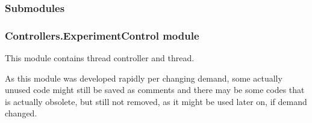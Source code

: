 \documentclass[letterpaper,10pt,english]{sphinxmanual}
\begin{document}
\subsubsection{Submodules}
\label{\detokenize{NoSeMazeControl/Controllers:submodules}}

\subsubsection{Controllers.ExperimentControl module}
\label{\detokenize{NoSeMazeControl/Controllers:module-Controllers.ExperimentControl}}\label{\detokenize{NoSeMazeControl/Controllers:controllers-experimentcontrol-module}}
\sphinxAtStartPar
This module contains thread controller and thread.

\sphinxAtStartPar
As this module was developed rapidly per changing demand, some actually
unused code might still be saved as comments and there may be some codes that is
actually obsolete, but still not removed, as it might be used later on, if
demand changed.
\end{document}
